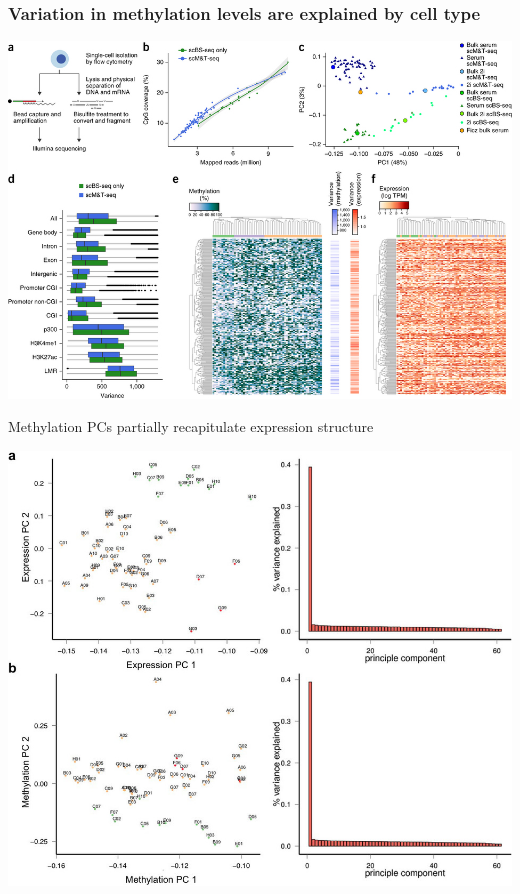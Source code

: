 \documentclass[10pt, compress]{beamer}
\renewcommand{\(}{\begin{columns}}
\renewcommand{\)}{\end{columns}}
\newcommand{\<}[1]{\begin{column}{#1}}
\renewcommand{\>}{\end{column}}
\begin{document}
\begin{frame}[fragile]
	\frametitle{Variation in methylation levels are explained by cell type}
	\vspace*{-20pt}
	\begin{center}
		\includegraphics[width=\linewidth,height=\textheight,keepaspectratio]{images/result1}
		\end{center}
\end{frame}


\begin{frame}[fragile]
\centering\large{Methylation PCs partially recapitulate expression structure}
	\vspace*{-10pt}
	\begin{center}
		
		\includegraphics[width=\linewidth,height=\textheight,keepaspectratio]{images/pca1}
	\end{center}
\end{frame}
\end{document}
